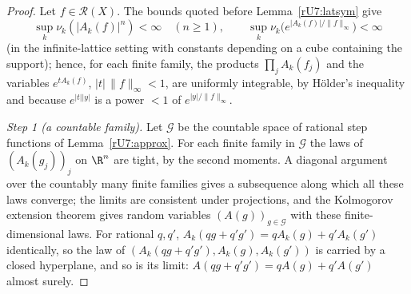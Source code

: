 \begin{proof}
Let $f\in\mathcal R(X)$. The bounds quoted before Lemma~\ref{rU7:latsym}
give
\[
\sup_k\nu_k(|A_k(f)|^n)<\infty\quad(n\ge1),\qquad
\sup_k\nu_k\bigl(e^{|A_k(f)|/\|f\|_\infty}\bigr)<\infty
\]
(in the infinite-lattice
setting with constants depending on a cube containing the support); hence,
for each finite family, the products $\prod_jA_k(f_j)$ and the variables
$e^{tA_k(f)}$, $|t|\,\|f\|_\infty<1$, are uniformly integrable, by H\"older's
inequality and because $e^{|t||y|}$ is a power $<1$ of $e^{|y|/\|f\|
_\infty}$.

\emph{Step 1 (a countable family).} Let $\mathcal G$ be the countable space of
rational step functions of Lemma~\ref{rU7:approx}. For each finite family in
$\mathcal G$ the laws of $(A_k(g_j))_j$ on $\R^n$ are tight, by the second
moments. A diagonal argument over the countably many finite families gives a
subsequence along which all these laws converge; the limits are consistent
under projections, and the Kolmogorov extension theorem gives random
variables $(A(g))_{g\in\mathcal G}$ with these finite-dimensional laws. For
rational $q,q'$, $A_k(qg+q'g')=qA_k(g)+q'A_k(g')$ identically, so the law of
$(A_k(qg+q'g'),A_k(g),A_k(g'))$ is carried by a closed hyperplane, and so is
its limit: $A(qg+q'g')=qA(g)+q'A(g')$ almost surely.


\end{proof}
